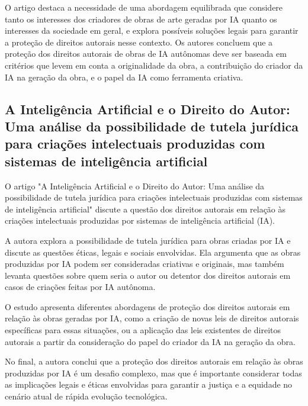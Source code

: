 \documentclass[12pt]{article}
\begin{document}
    O artigo destaca a necessidade de uma abordagem equilibrada que considere tanto os interesses dos criadores de obras de arte geradas por IA quanto os interesses da sociedade em geral, e explora possíveis soluções legais para garantir a proteção de direitos autorais nesse contexto. Os autores concluem que a proteção dos direitos autorais de obras de IA autônomas deve ser baseada em critérios que levem em conta a originalidade da obra, a contribuição do criador da IA na geração da obra, e o papel da IA como ferramenta criativa.

    \subsection{A Inteligência Artificial e o Direito do Autor: Uma análise da possibilidade de tutela jurídica para criações intelectuais produzidas com sistemas de inteligência artificial}
	\label{sec:trab_relacionados}

    O artigo "A Inteligência Artificial e o Direito do Autor: Uma análise da possibilidade de tutela jurídica para criações intelectuais produzidas com sistemas de inteligência artificial" discute a questão dos direitos autorais em relação às criações intelectuais produzidas por sistemas de inteligência artificial (IA).
    
    A autora explora a possibilidade de tutela jurídica para obras criadas por IA e discute as questões éticas, legais e sociais envolvidas. Ela argumenta que as obras produzidas por IA podem ser consideradas criativas e originais, mas também levanta questões sobre quem seria o autor ou detentor dos direitos autorais em casos de criações feitas por IA autônoma.
    
    O estudo apresenta diferentes abordagens de proteção dos direitos autorais em relação às obras geradas por IA, como a criação de novas leis de direitos autorais específicas para essas situações, ou a aplicação das leis existentes de direitos autorais a partir da consideração do papel do criador da IA na geração da obra.
    
    No final, a autora conclui que a proteção dos direitos autorais em relação às obras produzidas por IA é um desafio complexo, mas que é importante considerar todas as implicações legais e éticas envolvidas para garantir a justiça e a equidade no cenário atual de rápida evolução tecnológica.


\end{document}
